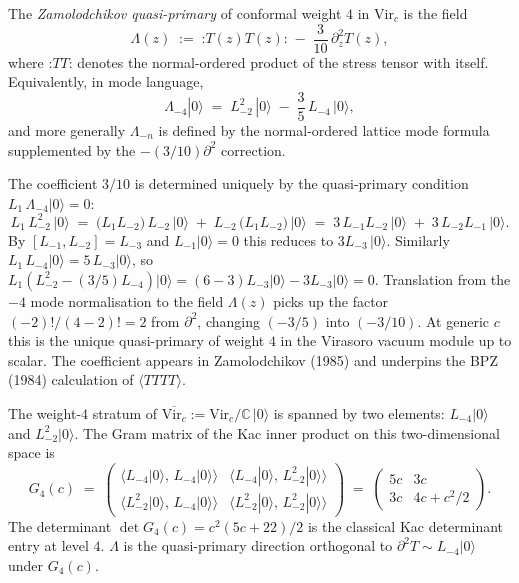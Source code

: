 \begin{definition}
\label{def:zamolodchikov-quasi-primary}
The \emph{Zamolodchikov quasi-primary} of conformal weight
\(4\) in \(\mathrm{Vir}_{c}\) is the field
\[
 \Lambda(z)
 \;:=\;
 {\mathord :} T(z) T(z) {\mathord :}
 \;-\;
 \frac{3}{10}\,\partial_{z}^{2} T(z),
\]
where \({\mathord :} T T {\mathord :}\) denotes the normal-ordered
product of the stress tensor with itself. Equivalently, in mode
language,
\[
 \Lambda_{-4} |0\rangle
 \;=\;
 L_{-2}^{2}\, |0\rangle
 \;-\;
 \frac{3}{5}\, L_{-4}\, |0\rangle,
\]
and more generally \(\Lambda_{-n}\) is defined by the
normal-ordered lattice mode formula supplemented by the
\(-(3/10)\partial^{2}\) correction.
\end{definition}

\begin{remark}
\label{rem:why-three-tenths}
The coefficient \(3/10\) is determined uniquely by the
quasi-primary condition
\(L_{1}\, \Lambda_{-4}|0\rangle = 0\):
\[
 L_{1}\, L_{-2}^{2}\,|0\rangle
 \;=\;
 \bigl(L_{1} L_{-2}\bigr)\, L_{-2}\,|0\rangle
 \;+\;
 L_{-2}\,\bigl(L_{1} L_{-2}\bigr)\,|0\rangle
 \;=\;
 3\, L_{-1} L_{-2}\,|0\rangle
 \;+\;
 3\, L_{-2} L_{-1}\,|0\rangle.
\]
By \([L_{-1},L_{-2}] = L_{-3}\) and \(L_{-1}|0\rangle = 0\) this
reduces to \(3 L_{-3}\,|0\rangle\). Similarly
\(L_{1}\, L_{-4}|0\rangle = 5\, L_{-3}|0\rangle\), so
\(L_{1}(L_{-2}^{2} - (3/5) L_{-4})|0\rangle = (6 - 3)L_{-3}|0\rangle - 3 L_{-3}|0\rangle = 0\).
Translation from the \(-4\) mode normalisation to the field
\(\Lambda(z)\) picks up the factor \((-2)!/(4-2)! = 2\) from
\(\partial^{2}\), changing \((-3/5)\) into \((-3/10)\). At
generic \(c\) this is the unique quasi-primary of weight \(4\)
in the Virasoro vacuum module up to scalar. The coefficient
appears in Zamolodchikov (1985) and underpins the BPZ (1984)
calculation of \(\langle T T T T \rangle\).
\end{remark}

\begin{remark}
\label{rem:zamolodchikov-weight-four-data}
The weight-\(4\) stratum of
\(\overline{\mathrm{Vir}_{c}} := \mathrm{Vir}_{c} / \mathbb{C}\,|0\rangle\)
is spanned by two elements: \(L_{-4}|0\rangle\) and
\(L_{-2}^{2}|0\rangle\). The Gram matrix of the Kac inner
product on this two-dimensional space is
\[
 G_{4}(c)
 \;=\;
 \begin{pmatrix}
 \langle L_{-4}|0\rangle,\, L_{-4}|0\rangle \rangle &
 \langle L_{-4}|0\rangle,\, L_{-2}^{2}|0\rangle \rangle \\[0.5ex]
 \langle L_{-2}^{2}|0\rangle,\, L_{-4}|0\rangle \rangle &
 \langle L_{-2}^{2}|0\rangle,\, L_{-2}^{2}|0\rangle \rangle
 \end{pmatrix}
 \;=\;
 \begin{pmatrix}
 5c & 3c \\
 3c & 4c + c^{2}/2
 \end{pmatrix}.
\]
The determinant \(\det G_{4}(c) = c^{2}(5c + 22)/2\) is the
classical Kac determinant entry at level \(4\). \(\Lambda\)
is the quasi-primary direction orthogonal to
\(\partial^{2} T \sim L_{-4}|0\rangle\) under
\(G_{4}(c)\).
\end{remark}

